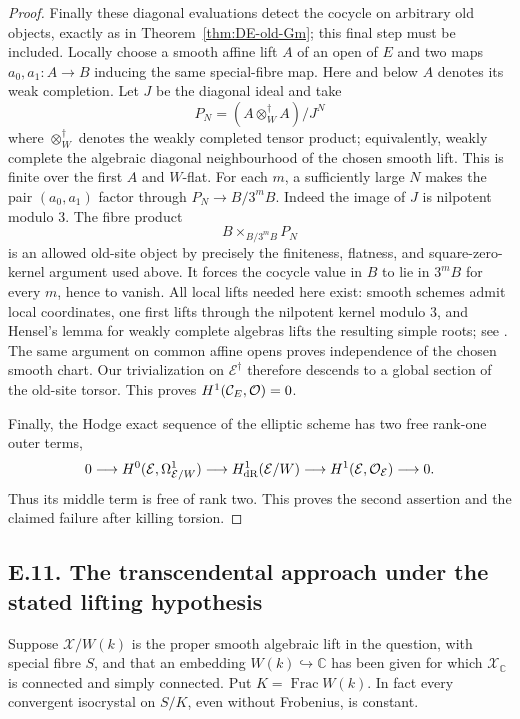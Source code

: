 \begin{proof}
Finally these diagonal evaluations detect the cocycle on arbitrary old objects, exactly as in Theorem~\ref{thm:DE-old-Gm}; this final step must be included.  Locally choose a smooth affine lift $A$ of an open of $E$ and two maps $a_0,a_1:A\to B$ inducing the same special-fibre map.  Here and below $A$ denotes its weak completion.  Let $J$ be the diagonal ideal and take
\[
                         P_N=(A\otimes_W^\dagger A)/J^N
\]
where $\otimes_W^\dagger$ denotes the weakly completed tensor product; equivalently, weakly complete the algebraic diagonal neighbourhood of the chosen smooth lift.  This is finite over the first $A$ and $W$-flat.  For each $m$, a sufficiently large $N$ makes the pair $(a_0,a_1)$ factor through $P_N\to B/3^mB$.  Indeed the image of $J$ is nilpotent modulo $3$.  The fibre product
\[
                         B\times_{B/3^mB}P_N
\]
is an allowed old-site object by precisely the finiteness, flatness, and square-zero-kernel argument used above.  It forces the cocycle value in $B$ to lie in $3^mB$ for every $m$, hence to vanish.  All local lifts needed here exist: smooth schemes admit local \etale coordinates, one first lifts through the nilpotent kernel modulo $3$, and Hensel's lemma for weakly complete algebras lifts the resulting simple roots; see \cite[Proposition~2.31 and the preceding very-smooth lifting discussion]{DavisLangerZink2012}.  The same argument on common affine opens proves independence of the chosen smooth chart.  Our trivialization on $\mathcal E^\dagger$ therefore descends to a global section of the old-site torsor.  This proves $H^1(\mathcal C_E,\mathcal O)=0$.

Finally, the Hodge exact sequence of the elliptic scheme has two free rank-one outer terms,
\[
 0\longrightarrow H^0(\mathcal E,\Omega^1_{\mathcal E/W})
  \longrightarrow H^1_{\mathrm{dR}}(\mathcal E/W)
  \longrightarrow H^1(\mathcal E,\mathcal O_{\mathcal E})\longrightarrow0.
\]
Thus its middle term is free of rank two.  This proves the second assertion and the claimed failure after killing torsion.
\end{proof}


\subsection{E.11. The transcendental approach under the stated lifting hypothesis}

Suppose $\mathcal X/W(k)$ is the proper smooth algebraic lift in the question, with special fibre $S$, and that an embedding $W(k)\hookrightarrow\mathbb C$ has been given for which $\mathcal X_{\mathbb C}$ is connected and simply connected.  Put $K=\operatorname{Frac}W(k)$.  In fact every convergent isocrystal on $S/K$, even without Frobenius, is constant.

